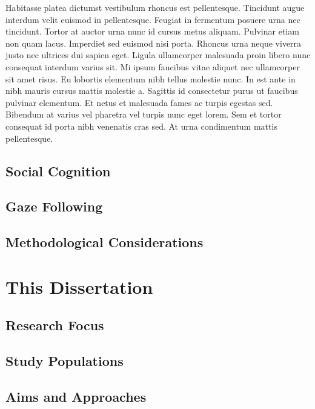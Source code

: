 \documentclass[
]{scrbook}
\begin{document}
Habitasse platea dictumst vestibulum rhoncus est pellentesque. Tincidunt augue interdum velit euismod in pellentesque. Feugiat in fermentum posuere urna nec tincidunt. Tortor at auctor urna nunc id cursus metus aliquam. Pulvinar etiam non quam lacus. Imperdiet sed euismod nisi porta. Rhoncus urna neque viverra justo nec ultrices dui sapien eget. Ligula ullamcorper malesuada proin libero nunc consequat interdum varius sit. Mi ipsum faucibus vitae aliquet nec ullamcorper sit amet risus. Eu lobortis elementum nibh tellus molestie nunc. In est ante in nibh mauris cursus mattis molestie a. Sagittis id consectetur purus ut faucibus pulvinar elementum. Et netus et malesuada fames ac turpis egestas sed. Bibendum at varius vel pharetra vel turpis nunc eget lorem. Sem et tortor consequat id porta nibh venenatis cras sed. At urna condimentum mattis pellentesque.

\section{Social Cognition}\label{social-cognition}

\section{Gaze Following}\label{gaze-following}

\section{Methodological Considerations}\label{methodological-considerations}

\chapter{This Dissertation}\label{aims}

\section{Research Focus}\label{research-focus}

\section{Study Populations}\label{study-populations}

\section{Aims and Approaches}\label{aims-and-approaches}
\end{document}
